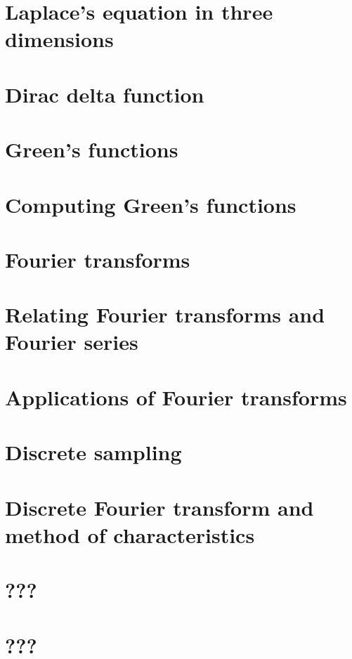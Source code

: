 \documentclass{article}
\begin{document}
\section{Laplace's equation in three dimensions}

\section{Dirac delta function}

\section{Green's functions}

\section{Computing Green's functions}

\section{Fourier transforms}

\section{Relating Fourier transforms and Fourier series}

\section{Applications of Fourier transforms}

\section{Discrete sampling}

\section{Discrete Fourier transform and method of characteristics}

\section{???}

\section{???}

\end{document}
